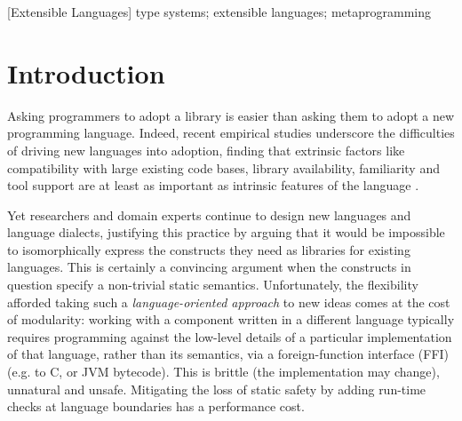 \documentclass[9pt]{sigplanconf}
\begin{document}
[Extensible Languages]
\keywords
type systems; extensible languages; metaprogramming
\section{Introduction}\label{intro}
Asking programmers to adopt a library is easier than asking them to adopt a new programming language. Indeed, recent empirical studies underscore the difficulties of driving new languages into adoption, finding that extrinsic factors like compatibility with large existing code bases, library availability, familiarity and tool support are at least as important as intrinsic features of the language \cite{Meyerovich:2013:EAP:2509136.2509515,chen05}. 

Yet researchers and domain experts continue to design new languages and language dialects, justifying this practice by  arguing that it would be  impossible to isomorphically express the constructs they need as libraries for existing languages. This is certainly a convincing argument when the constructs in question specify a non-trivial static semantics. %
Unfortunately, the flexibility afforded taking such a \emph{language-oriented approach} \cite{journals/stp/Ward94} to new ideas comes at the cost of modularity: working with a component written in a different language typically requires programming against the low-level details of a particular implementation of that language, rather than its semantics, via a foreign-function interface (FFI) (e.g. to C, or JVM bytecode). This is brittle (the implementation may change), unnatural and unsafe. Mitigating the loss of static safety by adding run-time checks at language boundaries has a performance cost. %
\end{document}
